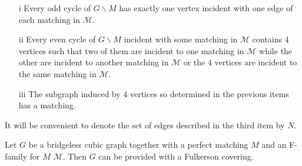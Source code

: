 \documentclass{amsart}
\theoremstyle{definition}
\theoremstyle{remark}
\begin{document}
 \begin{itemize}
   \item [i \label{Item:1}] Every odd cycle of $G \backslash M$ has exactly one
vertex
   incident with one edge of each matching in $\mathcal M$.
   \item [ii \label{Item:2}] Every even cycle of $G \backslash M$ incident with
some matching in $\mathcal M$   contains $4$ vertices such that
   two of them are incident to one matching in $\mathcal M$ while the other are
incident to another matching in $\mathcal
   M$ or the $4$ vertices are incident to the same matching in 
   $\mathcal M$.
   \item [ iii \label{Item:3}] The subgraph induced by $4$ vertices so determined in the previous
items has a matching.
 \end{itemize}
It will be convenient to denote the set of edges described in the
third item by $N$.
\begin{thm} \label{Theorem:TechnicalTool}  Let $G$ be a bridgeless cubic graph
together with
a perfect matching $M$ and an F-family for $M$ $\mathcal M$. Then $G$
can be provided with a Fulkerson covering.
\end{thm}
\end{document}
